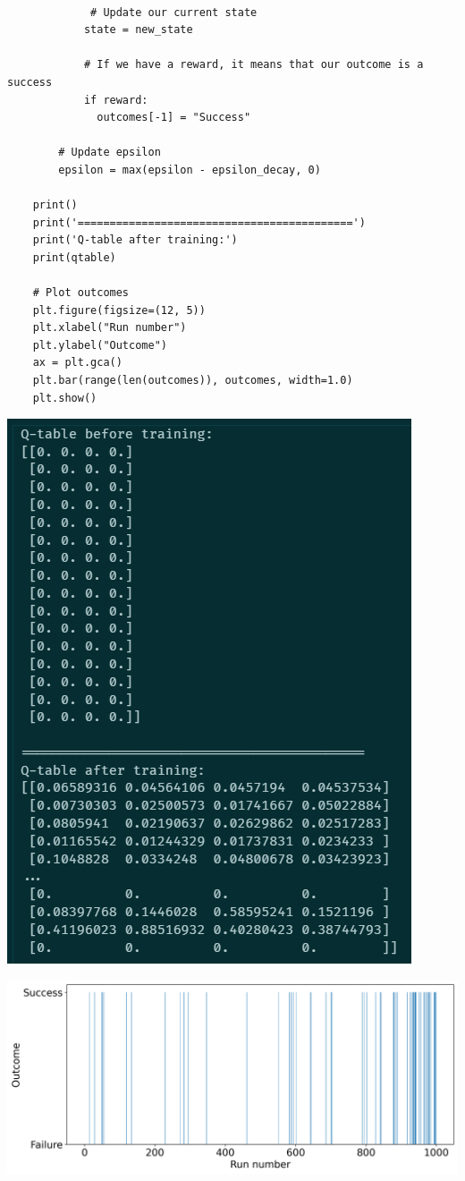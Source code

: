 \documentclass{article}
\begin{document}
\begin{lstlisting}[style=mystyle]
           
             # Update our current state
            state = new_state
    
            # If we have a reward, it means that our outcome is a success
            if reward:
              outcomes[-1] = "Success"
    
        # Update epsilon
        epsilon = max(epsilon - epsilon_decay, 0)
    
    print()
    print('===========================================')
    print('Q-table after training:')
    print(qtable)
    
    # Plot outcomes
    plt.figure(figsize=(12, 5))
    plt.xlabel("Run number")
    plt.ylabel("Outcome")
    ax = plt.gca()
    plt.bar(range(len(outcomes)), outcomes, width=1.0)
    plt.show()
\end{lstlisting}

\vspace{0.5cm}

\begin{center}
    \includegraphics[width=0.5\linewidth]{resbaladizo.png}
\end{center}

\vspace{0.5cm}

\begin{center}
    \includegraphics[width=0.75\linewidth]{resbaladizo_grafico.png}
\end{center}
\end{document}
